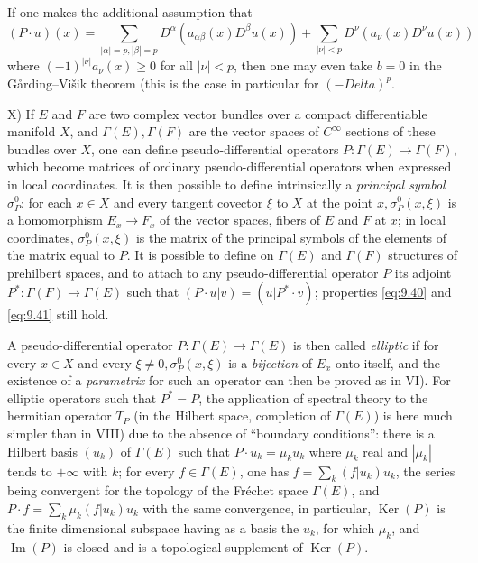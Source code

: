 \documentclass[12pt,a4paper,leqno,twoside]{extbook}
\newcommand{\Ker}{\operatorname{Ker}}
\begin{document}
If one makes the additional assumption that
\[
    (P \cdot u)(x) = \sum_{|\alpha|=p, |\beta|=p} D^\alpha \left( a_{\alpha\beta}(x) D^\beta u(x) \right) + \sum_{|\nu| < p} D^\nu \left( a_\nu(x) D^\nu u(x) \right)
\]
where \((-1)^{|\nu|} a_\nu(x) \geq 0\) for all \(|\nu| < p\), then one may even take \(b = 0\) in the Gårding--Višik theorem (this is the case in particular for \((-Delta)^p\).

X) If \(E\) and \(F\) are two complex vector bundles over a compact differentiable manifold \(X\), and \(\Gamma(E), \Gamma(F)\) are the vector spaces of \(C^\infty\) sections of these bundles over \(X\), one can define pseudo-differential operators \(P: \Gamma(E) \to \Gamma(F)\), which become matrices of ordinary pseudo-differential operators when expressed in local coordinates. It is then possible to define intrinsically a \emph{principal symbol} \(\sigma^0_P\): for each \(x \in X\) and every tangent covector \(\xi\) to \(X\) at the point \(x, \sigma^0_P(x, \xi)\) is a homomorphism \(E_x \to F_x\) of the vector spaces, fibers of \(E\) and \(F\) at \(x\); in local coordinates, \(\sigma^0_P(x, \xi)\) is the matrix of the principal symbols of the elements of the matrix equal to \(P\). It is possible to define on \(\Gamma(E)\) and \(\Gamma(F)\) structures of prehilbert spaces, and to attach to any pseudo-differential operator \(P\) its adjoint \(P^*: \Gamma(F) \to \Gamma(E)\) such that \((P \cdot u|v) = (u | P^* \cdot v)\); properties \eqref{eq:9.40} and \eqref{eq:9.41} still hold.

A pseudo-differential operator \(P: \Gamma(E) \to \Gamma(E)\) is then called \emph{elliptic} if for every \(x \in X\) and every \(\xi \neq 0, \sigma^0_P(x, \xi)\) is a \emph{bijection} of \(E_x\) onto itself, and the existence of a \emph{parametrix} for such an operator can then be proved as in VI). For elliptic operators such that \(P^* = P\), the application of spectral theory to the hermitian operator \(T_P\) (in the Hilbert space, completion of \(\Gamma(E)\)) is here much simpler than in VIII) due to the absence of ``boundary conditions'': there is a Hilbert basis \((u_k)\) of \(\Gamma(E)\) such that \(P \cdot u_k = \mu_k u_k\) where \(\mu_k\) real and \(|\mu_k|\) tends to \(+\infty\) with \(k\); for every \(f \in \Gamma(E)\), one has \(f = \sum\limits_k (f | u_k) u_k\), the series being convergent for the topology of the Fréchet space \(\Gamma(E)\), and \(P \cdot f = \sum\limits_k \mu_k (f | u_k) u_k\) with the same convergence, in particular, \(\Ker(P)\) is the finite dimensional subspace having as a basis the \(u_k\), for which \(\mu_k\), and \(\operatorname{Im}(P)\) is closed and is a topological supplement of \(\Ker(P)\).
\end{document}
